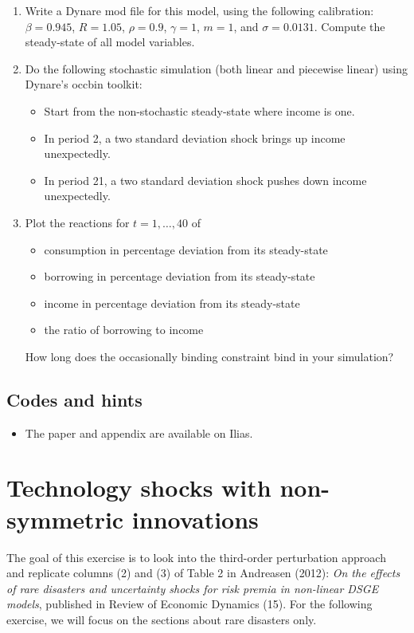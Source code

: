 \documentclass{article}
\begin{document}
\begin{enumerate}[resume]
\item
Write a Dynare mod file for this model, using the following calibration:
  \(\beta=0.945\), \(R=1.05\), \(\rho=0.9\), \(\gamma=1\), \(m=1\), and \(\sigma=0.0131\).
Compute the steady-state of all model variables.

\item
Do the following stochastic simulation (both linear and piecewise linear) using Dynare's occbin toolkit:
\begin{itemize}
\item Start from the non-stochastic steady-state where income is one.
\item In period 2, a two standard deviation shock brings up income unexpectedly.
\item In period 21, a two standard deviation shock pushes down income unexpectedly.
\end{itemize}

\item
Plot the reactions for \(t=1,\ldots ,40\) of
\begin{itemize}
\item consumption in percentage deviation from its steady-state
\item borrowing in percentage deviation from its steady-state
\item income in percentage deviation from its steady-state
\item the ratio of borrowing to income  
\end{itemize}
How long does the occasionally binding constraint bind in your simulation?
\end{enumerate}

\newpage

\subsection*{Codes and hints}

\begin{itemize}
\item The paper and appendix are available on Ilias.
\end{itemize}

\newpage

\section[Technology shocks with non-symmetric innovations]{Technology shocks with non-symmetric innovations\label{ex:Andreasen_2012}}
The goal of this exercise is to look into the third-order perturbation approach and replicate columns (2) and (3) of Table 2 in Andreasen (2012):
  \emph{On the effects of rare disasters and uncertainty shocks for risk premia in non-linear DSGE models},
  published in Review of Economic Dynamics (15).
For the following exercise, we will focus on the sections about rare disasters only.
\end{document}
